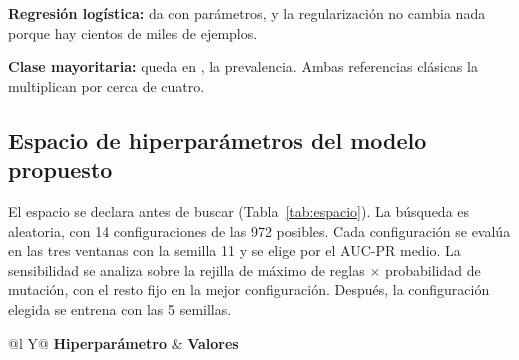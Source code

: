 \textbf{Regresión logística:} da \cifValLogistica{} con \cifParamLR{} parámetros, y la regularización no cambia nada porque hay cientos de miles de ejemplos.

\textbf{Clase mayoritaria:} queda en \cifValMayoritaria{}, la prevalencia. Ambas referencias clásicas la multiplican por cerca de cuatro.


\subsection{Espacio de hiperparámetros del modelo propuesto}

El espacio se declara antes de buscar (Tabla~\ref{tab:espacio}). La búsqueda es aleatoria, con 14 configuraciones de las 972 posibles. Cada configuración se evalúa en las tres ventanas con la semilla 11 y se elige por el AUC-PR medio. La sensibilidad se analiza sobre la rejilla de máximo de reglas $\times$ probabilidad de mutación, con el resto fijo en la mejor configuración. Después, la configuración elegida se entrena con las 5 semillas.

\begin{table}[!t]
\caption{Espacio de hiperparámetros del difuso-evolutivo}
\label{tab:espacio}
\centering\footnotesize
\begin{tabularx}{\columnwidth}{@{}l Y@{}}
\toprule
\cabecera \textbf{Hiperparámetro} & \textbf{Valores}\\
\midrule
{}
\bottomrule
\end{tabularx}
\end{table}
